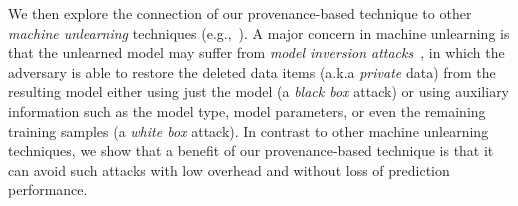 \documentclass[11pt]{article}
\newcommand{\priu}{PrIU}
\newcommand{\deltagrad}{DeltaGrad}
\begin{document}


We then explore the connection of our provenance-based technique to other {\em machine unlearning} techniques (e.g.,~\cite{bourtoule2021machine}).  A major concern in machine unlearning is that the unlearned model may suffer from \emph{model inversion attacks}~\cite{fredrikson2015model}, in which the adversary is able to restore the deleted data items (a.k.a {\em private} data) from the resulting model either using just the model (a {\em black box} attack) or using auxiliary information such as the model type, model parameters, or even the remaining training samples (a {\em white box} attack).  In contrast to other machine unlearning techniques, we show that a benefit of our provenance-based technique is that it can avoid such attacks with low overhead and without loss of prediction performance.
\end{document}
